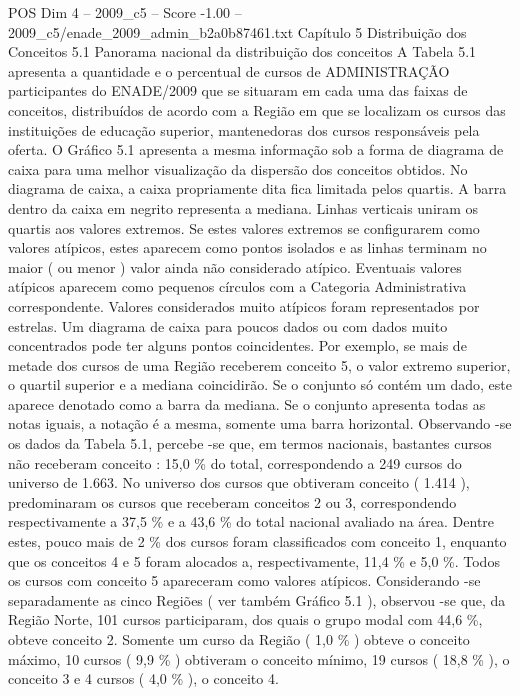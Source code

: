 \begin{textsample}{POS Dim 4 – 2009\_c5 – Score -1.00 – 2009\_c5/enade\_2009\_admin\_b2a0b87461.txt}  \label{ex:f4_pos_261}
Capítulo 5 Distribuição dos Conceitos 5.1 Panorama nacional da distribuição dos conceitos A Tabela 5.1 apresenta a quantidade e o percentual de cursos de ADMINISTRAÇÃO participantes do ENADE/2009 que se situaram em cada uma das faixas de conceitos, distribuídos de acordo com a Região em que se localizam os cursos das instituições de educação superior, mantenedoras dos cursos responsáveis pela oferta.
O Gráfico 5.1 apresenta a mesma informação sob a forma de diagrama de caixa para uma melhor visualização da dispersão dos conceitos obtidos.
No diagrama de caixa, a caixa propriamente dita fica limitada pelos quartis.
A barra dentro da caixa em negrito representa a mediana.
Linhas verticais uniram os quartis aos valores extremos.
Se estes valores extremos se configurarem como valores atípicos, estes aparecem como pontos isolados e as linhas terminam no maior ( ou menor ) valor ainda não considerado atípico.
Eventuais valores atípicos aparecem como pequenos círculos com a Categoria Administrativa correspondente.
Valores considerados muito atípicos foram representados por estrelas.
Um diagrama de caixa para poucos dados ou com dados muito concentrados pode ter alguns pontos coincidentes.
Por exemplo, se mais de metade dos cursos de uma Região receberem conceito 5, o valor extremo superior, o quartil superior e a mediana coincidirão.
Se o conjunto só contém um dado, este aparece denotado como a barra da mediana.
Se o conjunto apresenta todas as notas iguais, a notação é a mesma, somente uma barra horizontal.
Observando -se os dados da Tabela 5.1, percebe -se que, em termos nacionais, bastantes cursos não receberam conceito : 15,0 \% do total, correspondendo a 249 cursos do universo de 1.663.
No universo dos cursos que obtiveram conceito ( 1.414 ), predominaram os cursos que receberam conceitos 2 ou 3, correspondendo respectivamente a 37,5 \% e a 43,6 \% do total nacional avaliado na área.
Dentre estes, pouco mais de 2 \% dos cursos foram classificados com conceito 1, enquanto que os conceitos 4 e 5 foram alocados a, respectivamente, 11,4 \% e 5,0 \%.
Todos os cursos com conceito 5 apareceram como valores atípicos.
Considerando -se separadamente as cinco Regiões ( ver também Gráfico 5.1 ), observou -se que, da Região Norte, 101 cursos participaram, dos quais o grupo modal com 44,6 \%, obteve conceito 2.
Somente um curso da Região ( 1,0 \% ) obteve o conceito máximo, 10 cursos ( 9,9 \% ) obtiveram o conceito mínimo, 19 cursos ( 18,8 \% ), o conceito 3 e 4 cursos ( 4,0 \% ), o conceito 4.

\end{textsample}
